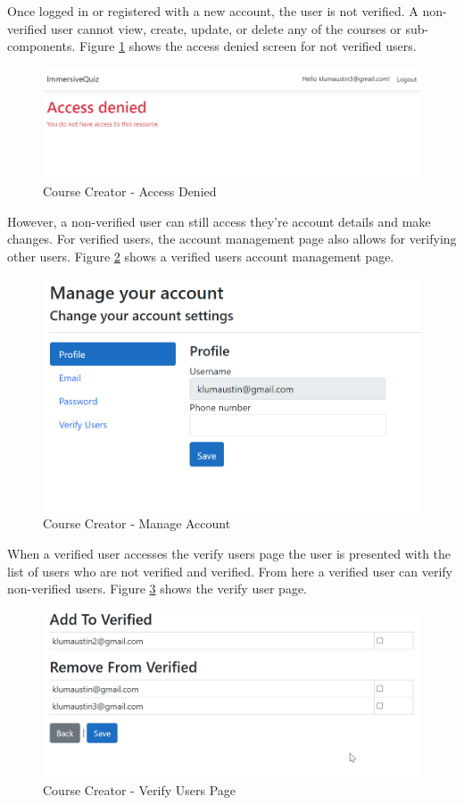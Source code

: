 Once logged in or registered with a new account, the user is not verified. A non-verified user cannot view, create, update, or delete any of the courses or sub-components. Figure \ref{CC Denied} shows the access denied screen for not verified users. 
\begin{figure}[htb]
	\centering
	\includegraphics[width=.6\textwidth]{Requirements/assets/cc-access-denied.png}
	\caption[Course Creator - Access Denied]{\label{CC Denied}Course Creator - Access Denied}
\end{figure}
However, a non-verified user can still access they're account details and make changes. For verified users, the account management page also allows for verifying other users. Figure \ref{CC Manage Account} shows a verified users account management page.
\begin{figure}[htb]
	\centering
	\includegraphics[width=.6\textwidth]{Requirements/assets/cc-manage-account.png}
	\caption[Course Creator - Manage Account]{\label{CC Manage Account}Course Creator - Manage Account}
\end{figure}
When a verified user accesses the verify users page the user is presented with the list of users who are not verified and verified. From here a verified user can verify non-verified users. Figure \ref{CC Verify} shows the verify user page. 
\begin{figure}[htb]
	\centering
	\includegraphics[width=.6\textwidth]{Requirements/assets/cc-add-verified-user.png}
	\caption[Course Creator - Verify Users Page]{\label{CC Verify}Course Creator - Verify Users Page}
\end{figure}
